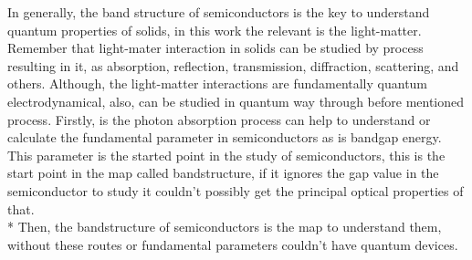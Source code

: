 In generally, the band structure of semiconductors is the key to understand quantum properties of solids, in this work the  relevant is the light-matter. Remember that light-mater interaction in solids can be studied by process resulting in it, as absorption, reflection, transmission, diffraction, scattering, and others\cite{rivera2020light}.  Although, the light-matter interactions are fundamentally  quantum electrodynamical, also, can be studied in quantum way through before mentioned process. Firstly, is the photon absorption process can help to understand or calculate the fundamental parameter in semiconductors as is bandgap energy. 
This parameter is the started point in the study of semiconductors, this is the start point in the map called bandstructure, if it ignores the gap value in the semiconductor to study it couldn't possibly get the principal optical properties of that. \\*
Then, the bandstructure of semiconductors is the map to understand them, without these routes or fundamental parameters couldn't have quantum devices. 
 
